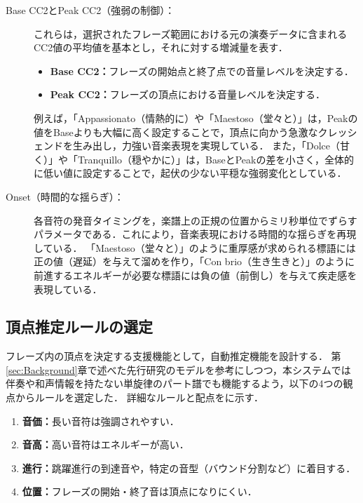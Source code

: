 \begin{description}
	\item[Base CC2とPeak CC2（強弱の制御）：]
	      これらは，選択されたフレーズ範囲における元の演奏データに含まれるCC2値の平均値を基本とし，それに対する増減量を表す．
	      \begin{itemize}
		      \item \textbf{Base CC2：}フレーズの開始点と終了点での音量レベルを決定する．
		      \item \textbf{Peak CC2：}フレーズの頂点における音量レベルを決定する．
	      \end{itemize}
	      例えば，「Appassionato（情熱的に）や「Maestoso（堂々と）」は，Peakの値をBaseよりも大幅に高く設定することで，頂点に向かう急激なクレッシェンドを生み出し，力強い音楽表現を実現している．
	      また，「Dolce（甘く）」や「Tranquillo（穏やかに）」は，BaseとPeakの差を小さく，全体的に低い値に設定することで，起伏の少ない平穏な強弱変化としている．

	\item[Onset（時間的な揺らぎ）：]
	      各音符の発音タイミングを，楽譜上の正規の位置からミリ秒単位でずらすパラメータである．これにより，音楽表現における時間的な揺らぎを再現している．
	      「Maestoso（堂々と）」のように重厚感が求められる標語には正の値（遅延）を与えて溜めを作り，「Con brio（生き生きと）」のように前進するエネルギーが必要な標語には負の値（前倒し）を与えて疾走感を表現している．
\end{description}

\subsection{頂点推定ルールの選定} \label{sec:ApexRule}
フレーズ内の頂点を決定する支援機能として，自動推定機能を設計する．
第\ref{sec:Background}章で述べた先行研究\cite{Apex_group}のモデルを参考にしつつ，本システムでは伴奏や和声情報を持たない単旋律のパート譜でも機能するよう，以下の4つの観点からルールを選定した．
詳細なルールと配点をに示す．

\begin{enumerate}
	\item \textbf{音価：}長い音符は強調されやすい．
	\item \textbf{音高：}高い音符はエネルギーが高い．
	\item \textbf{進行：}跳躍進行の到達音や，特定の音型（バウンド分割など）に着目する．
	\item \textbf{位置：}フレーズの開始・終了音は頂点になりにくい．
\end{enumerate}

